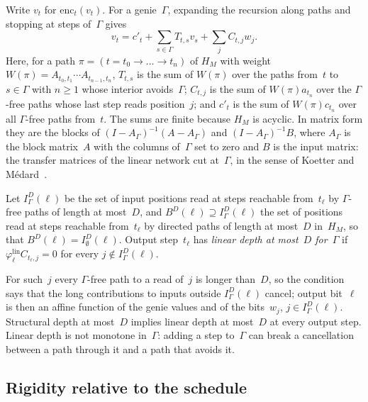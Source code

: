 Write $v_t$ for $\mathrm{enc}_t(v_t)$. For a genie~$\Gamma$, expanding the recursion along paths and stopping at steps
of~$\Gamma$ gives
\[
  v_t=c'_t+\sum_{s\in\Gamma}T_{t,s}v_s+\sum_jC_{t,j}w_j .
\]
Here, for a path $\pi=(t=t_0\to\dots\to t_n)$ of $H_M$ with weight $W(\pi)=A_{t_0,t_1}\cdots A_{t_{n-1},t_n}$, $T_{t,s}$ is
the sum of $W(\pi)$ over the paths from~$t$ to $s\in\Gamma$ with $n\ge1$ whose interior avoids~$\Gamma$; $C_{t,j}$ is the sum
of $W(\pi)a_{t_n}$ over the $\Gamma$-free paths whose last step reads position~$j$; and $c'_t$ is the sum of $W(\pi)c_{t_n}$
over all $\Gamma$-free paths from~$t$. The sums are finite because $H_M$ is acyclic. In matrix form they are the blocks of
$(I-A_\Gamma)^{-1}(A-A_\Gamma)$ and $(I-A_\Gamma)^{-1}B$, where $A_\Gamma$ is the block matrix~$A$ with the columns of~$\Gamma$
set to zero and $B$ is the input matrix: the transfer matrices of the linear network cut at~$\Gamma$, in the sense of Koetter and
Médard~\cite{KoetterMedard2003}.

\begin{definition}\label{def:linear-depth}
Let $I^D_\Gamma(\ell)$ be the set of input positions read at steps reachable from~$t_\ell$ by $\Gamma$-free paths of length
at most~$D$, and $B^D(\ell)\supseteq I^D_\Gamma(\ell)$ the set of positions read at steps reachable from~$t_\ell$ by directed paths of
length at most~$D$ in~$H_M$, so that $B^D(\ell)=I^D_\emptyset(\ell)$. Output step~$t_\ell$ has \emph{linear depth at most~$D$ for~$\Gamma$} if
$\varphi_\ell^{\mathrm{lin}}C_{t_\ell,j}=0$ for every $j\notin I^D_\Gamma(\ell)$.
\end{definition}

For such~$j$ every $\Gamma$-free path to a read of~$j$ is longer than~$D$, so the condition says that the long contributions
to inputs outside $I^D_\Gamma(\ell)$ cancel; output bit~$\ell$ is then an affine function of the genie values and of the
bits~$w_j$, $j\in I^D_\Gamma(\ell)$. Structural depth at most~$D$ implies linear depth at most~$D$ at every output step.
Linear depth is not monotone in~$\Gamma$: adding a step to~$\Gamma$ can break a cancellation between a path through it and a
path that avoids it.

\subsection{Rigidity relative to the schedule}\label{sec:lin-rigid}


